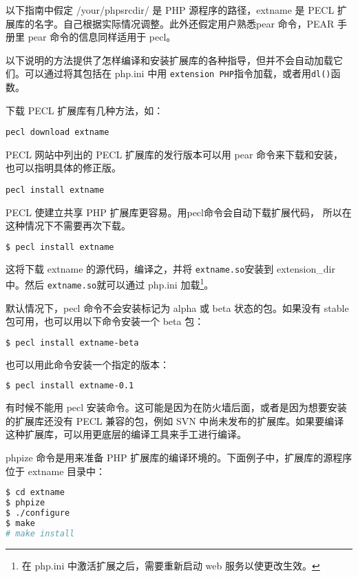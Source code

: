 以下指南中假定 /your/phpsrcdir/ 是 PHP 源程序的路径，extname 是 PECL 扩展库的名字。自己根据实际情况调整。此外还假定用户熟悉pear 命令，PEAR 手册里 pear 命令的信息同样适用于 pecl。

以下说明的方法提供了怎样编译和安装扩展库的各种指导，但并不会自动加载它们。可以通过将其包括在 php.ini 中用 \texttt{extension PHP}指令加载，或者用\texttt{dl()}函数。

下载 PECL 扩展库有几种方法，如：

\begin{compactitem}
\item \texttt{pecl download extname}

PECL 网站中列出的 PECL 扩展库的发行版本可以用 pear 命令来下载和安装，也可以指明具体的修正版。



\item \texttt{pecl install extname}

PECL 使建立共享 PHP 扩展库更容易。用pecl命令会自动下载扩展代码， 所以在这种情况下不需要再次下载。

\begin{lstlisting}[language=bash]
$ pecl install extname
\end{lstlisting}

这将下载 extname 的源代码，编译之，并将 \texttt{extname.so}安装到 extension\_dir 中。然后 \texttt{extname.so}就可以通过 php.ini 加载\footnote{在 php.ini 中激活扩展之后，需要重新启动 web 服务以使更改生效。}。

默认情况下，pecl 命令不会安装标记为 alpha 或 beta 状态的包。如果没有 stable 包可用，也可以用以下命令安装一个 beta 包：

\begin{lstlisting}[language=bash]
$ pecl install extname-beta
\end{lstlisting}

也可以用此命令安装一个指定的版本：

\begin{lstlisting}[language=bash]
$ pecl install extname-0.1
\end{lstlisting}

有时候不能用 pecl 安装命令。这可能是因为在防火墙后面，或者是因为想要安装的扩展库还没有 PECL 兼容的包，例如 SVN 中尚未发布的扩展库。如果要编译这种扩展库，可以用更底层的编译工具来手工进行编译。

phpize 命令是用来准备 PHP 扩展库的编译环境的。下面例子中，扩展库的源程序位于 extname 目录中：

\begin{lstlisting}[language=bash]
$ cd extname
$ phpize
$ ./configure
$ make
# make install
\end{lstlisting}


\end{compactitem}
